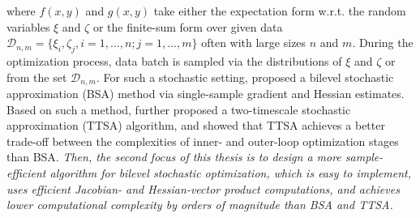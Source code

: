 \documentclass{osudissert96}
\def\gD{{\mathcal{D}}}
\begin{document}
where $f(x,y)$ and $g(x,y)$ take either the expectation form w.r.t. the random variables $\xi$ and $\zeta$ or the finite-sum form over given 
data $\gD_{n,m}=\{\xi_i,\zeta_j, i=1,...,n;j=1,...,m\}$ often with large sizes $n$ and $m$. During the optimization process, data batch is sampled via the distributions of $\xi$ and $\zeta$ or from the set $\gD_{n,m}$. For such a stochastic setting, \cite{ghadimi2018approximation} proposed a bilevel stochastic approximation (BSA) method via single-sample gradient and Hessian estimates.  Based on such a method, \cite{hong2020two} further proposed a two-timescale stochastic approximation (TTSA) algorithm, and showed that TTSA achieves a better trade-off between the complexities of inner- and outer-loop optimization stages than BSA. %
{\em Then, the second focus of this thesis is to design a more sample-efficient algorithm for bilevel  stochastic optimization, which is easy to implement, uses efficient Jacobian- and Hessian-vector product computations,  and 
achieves lower computational complexity by orders of magnitude than BSA and TTSA.}
\end{document}

